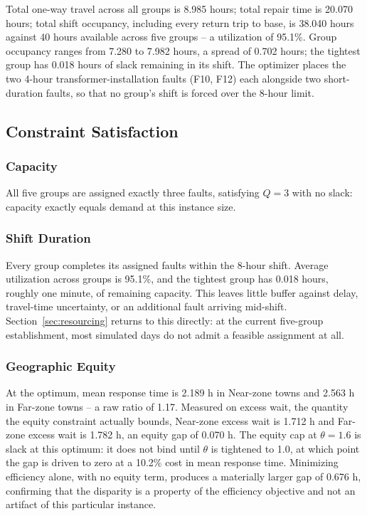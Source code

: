\documentclass[11pt]{article}
\begin{document}
Total one-way travel across all groups is 8.985 hours; total repair time is 20.070 hours; total shift occupancy, including every return trip to base, is 38.040 hours against 40 hours available across five groups -- a utilization of 95.1\%. Group occupancy ranges from 7.280 to 7.982 hours, a spread of 0.702 hours; the tightest group has 0.018 hours of slack remaining in its shift. The optimizer places the two 4-hour transformer-installation faults (F10, F12) each alongside two short-duration faults, so that no group's shift is forced over the 8-hour limit.

\subsection*{Constraint Satisfaction}

\subsubsection*{Capacity}

All five groups are assigned exactly three faults, satisfying $Q=3$ with no slack: capacity exactly equals demand at this instance size.

\subsubsection*{Shift Duration}

Every group completes its assigned faults within the 8-hour shift. Average utilization across groups is 95.1\%, and the tightest group has 0.018 hours, roughly one minute, of remaining capacity. This leaves little buffer against delay, travel-time uncertainty, or an additional fault arriving mid-shift. Section~\ref{sec:resourcing} returns to this directly: at the current five-group establishment, most simulated days do not admit a feasible assignment at all.

\subsubsection*{Geographic Equity}

At the optimum, mean response time is 2.189 h in Near-zone towns and 2.563 h in Far-zone towns -- a raw ratio of 1.17. Measured on excess wait, the quantity the equity constraint actually bounds, Near-zone excess wait is 1.712 h and Far-zone excess wait is 1.782 h, an equity gap of 0.070 h. The equity cap at $\theta=1.6$ is slack at this optimum: it does not bind until $\theta$ is tightened to 1.0, at which point the gap is driven to zero at a 10.2\% cost in mean response time. Minimizing efficiency alone, with no equity term, produces a materially larger gap of 0.676 h, confirming that the disparity is a property of the efficiency objective and not an artifact of this particular instance.
\end{document}
